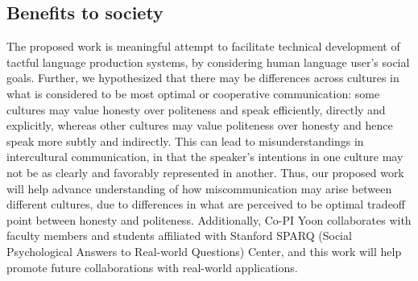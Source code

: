 \subsection{Benefits to society}
The proposed work is meaningful attempt to facilitate technical development of tactful language production systems, by considering human language user's social goals. Further, we hypothesized that there may be differences across cultures in what is considered to be most optimal or cooperative communication: some cultures may value honesty over politeness and speak efficiently, directly and explicitly, whereas other cultures may value politeness over honesty and hence speak more subtly and indirectly. This can lead to misunderstandings in intercultural communication, in that the speaker's intentions in one culture may not be as clearly and favorably represented in another. Thus, our proposed work will help advance understanding of how miscommunication may arise between different cultures, due to differences in what are perceived to be optimal tradeoff point between honesty and politeness. Additionally, Co-PI Yoon collaborates with faculty members and students affiliated with Stanford SPARQ (Social Psychological Answers to Real-world Questions) Center, and this work will help promote future collaborations with real-world applications.
